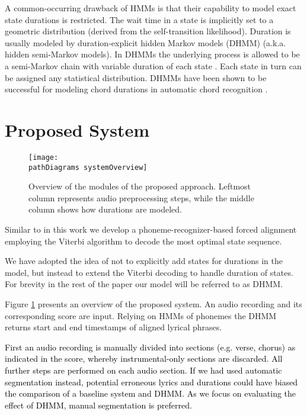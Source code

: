 \documentclass{article}
\def\pathDiagrams{/Users/joro/Documents/Phd/UPF/papers/DurationHSMM_polyphonic_EUSIPCO/}
\begin{document}
A common-occurring drawback of HMMs is that their capability to model
exact state durations is restricted. The wait time in a state is implicitly
set to a geometric distribution (derived from the self-transition
likelihood). Duration is usually modeled by duration-explicit hidden
Markov models (DHMM) (a.k.a. hidden semi-Markov models). In DHMMs
the underlying process is allowed to be a semi-Markov chain with variable
duration of each state \cite{yu2010hidden}. Each state in turn can
be assigned any statistical distribution. DHMMs have been shown to
be successful for modeling chord durations in automatic chord recognition
\cite{chen2012chord}. 


\section{Proposed System}

\begin{figure}
\begin{minipage}[b]{1\linewidth}%
\centering  \centerline{\texttt{[image: \\pathDiagrams systemOverview]}}{\small{}\medskip{}
}%
\end{minipage} \protect\caption{Overview of the modules of the proposed approach. Leftmost column
represents audio preprocessing steps, while the middle column shows
how durations are modeled. }


\label{Diagram}
\end{figure}


Similar to \cite{fujihara2011lyricsynchronizer} in this work we develop
a phoneme-recognizer-based forced alignment employing the Viterbi
algorithm \cite{rabiner1989tutorial} to decode the most optimal state
sequence. %


We have adopted the idea of \cite{chen2012chord} not to explicitly
add states for durations in the model, but instead to extend the Viterbi
decoding to handle duration of states. For brevity in the rest of
the paper our model will be referred to as DHMM.

Figure \ref{Diagram} presents an overview of the proposed system.
An audio recording and its corresponding score are input. Relying
on HMMs of phonemes the DHMM returns start and end timestamps of aligned
lyrical phrases.

\textcolor{black}{First an audio recording is manually divided into
sections  (e.g. verse, chorus) as indicated in the score, whereby
instrumental-only sections are discarded. All further steps are performed
on each audio section. If we had used automatic segmentation instead,
potential erroneous lyrics and durations could have biased the comparison
of a baseline system and DHMM. As we focus on evaluating the effect
of DHMM, manual segmentation is preferred.}
\end{document}
